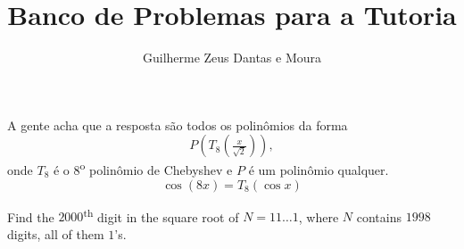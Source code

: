 \documentclass[10pt,a4paper]{scrartcl}
\title{Banco de Problemas para a Tutoria}
\author{Guilherme Zeus Dantas e Moura}
\begin{document}
	
	\zeustitle



	\begin{sk}
		A gente acha que a resposta são todos os polinômios da forma 
		\[
			P(T_8(\tfrac{x}{\sqrt{2}})),
		\] onde \(T_8\) é o \(8\)\textsuperscript{o} polinômio de Chebyshev e \(P\) é um polinômio qualquer.
		\[
			\cos(8x) = T_8(\cos x)
		\]
	\end{sk}


	\newpage
	\begin{prob}
		Find the $2000$\textsuperscript{th} digit in the square root of $N = 11\dots1$, where $N$ contains $1998$ digits, all of them $1$'s.
	\end{prob}
\end{document}
